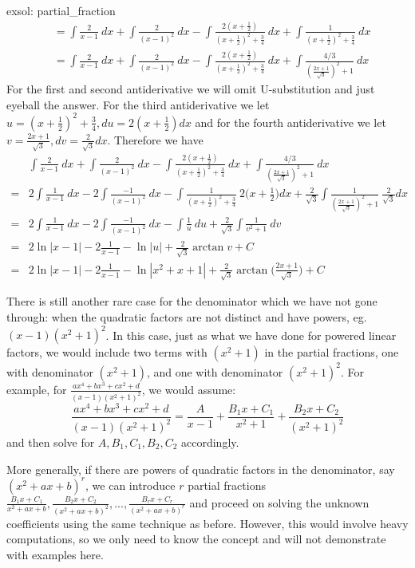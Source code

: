\begin{exsol}[]{exsol: partial_fraction}
\begin{align*}
        &= \int \frac{2}{x-1}~dx + \int \frac{2}{(x-1)^2}~dx - \int \frac{2(x+\frac{1}{2})}{(x+\frac{1}{2})^2+\frac{3}{4}}~dx + \int \frac{1}{(x+\frac{1}{2})^2+\frac{3}{4}}~dx\\
        &= \int \frac{2}{x-1}~dx + \int \frac{2}{(x-1)^2}~dx - \int \frac{2(x+\frac{1}{2})}{(x+\frac{1}{2})^2+\frac{3}{4}}~dx + \int \frac{4/3}{(\frac{2x+1}{\sqrt{3}})^2+1}~dx
    \end{align*}
    For the first and second antiderivative we will omit U-substitution and just eyeball the answer.  For the third antiderivative we let $u = (x+\frac{1}{2})^2+\frac{3}{4}, du = 2(x+\frac{1}{2})dx$ and for the fourth antiderivative we let $v = \frac{2x+1}{\sqrt{3}}, dv = \frac{2}{\sqrt{3}}dx$.  Therefore we have
    \begin{align*}
        &\int \frac{2}{x-1}~dx + \int \frac{2}{(x-1)^2}~dx - \int \frac{2(x+\frac{1}{2})}{(x+\frac{1}{2})^2+\frac{3}{4}}~dx + \int \frac{4/3}{(\frac{2x+1}{\sqrt{3}})^2+1}~dx\\
        =& 2\int \frac{1}{x-1}~dx - 2\int \frac{-1}{(x-1)^2}~dx - \int \frac{1}{(x+\frac{1}{2})^2+\frac{3}{4}}~2\Big(x+\frac{1}{2}\Big)dx + \frac{2}{\sqrt{3}}\int \frac{1}{(\frac{2x+1}{\sqrt{3}})^2+1}~\frac{2}{\sqrt{3}}dx\\
        =& 2\int \frac{1}{x-1}~dx - 2\int \frac{-1}{(x-1)^2}~dx - \int \frac{1}{u}~du + \frac{2}{\sqrt{3}}\int \frac{1}{v^2+1}~dv\\
        =& 2\ln |x-1| - 2 \frac{1}{x-1} - \ln |u| + \frac{2}{\sqrt{3}}\arctan v + C\\
        =& 2\ln |x-1| - 2 \frac{1}{x-1} - \ln |x^2+x+1| + \frac{2}{\sqrt{3}}\arctan \Big(\frac{2x+1}{\sqrt{3}}\Big) + C
    \end{align*}
\end{exsol}
There is still another rare case for the denominator which we have not gone through: when the quadratic factors are not distinct and have powers, eg. $(x-1)(x^2+1)^2$.  In this case, just as what we have done for powered linear factors, we would include two terms with $(x^2+1)$ in the partial fractions, one with denominator $(x^2+1)$, and one with denominator $(x^2+1)^2$.  For example, for $\frac{ax^4+bx^3+cx^2+d}{(x-1)(x^2+1)^2}$, we would assume:
\[\frac{ax^4+bx^3+cx^2+d}{(x-1)(x^2+1)^2} = \frac{A}{x-1} + \frac{B_1x+C_1}{x^2+1} + \frac{B_2x+C_2}{(x^2+1)^2}\]
and then solve for $A, B_1, C_1, B_2, C_2$ accordingly. 

More generally, if there are powers of quadratic factors in the denominator, say $(x^2+ax+b)^r$, we can introduce $r$ partial fractions $\frac{B_1x+C_1}{x^2+ax+b}, \frac{B_2x+C_2}{(x^2+ax+b)^2}, ..., \frac{B_r x+C_r}{(x^2+ax+b)^r}$ and proceed on solving the unknown coefficients using the same technique as before.  However, this would involve heavy computations, so we only need to know the concept and will not demonstrate with examples here. 

